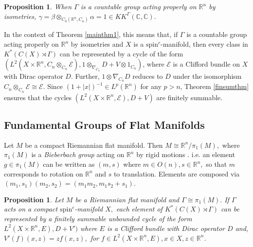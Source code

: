 \documentclass[a4paper,reqno]{amsart}
\numberwithin{equation}{section}
\def\C{\mathbb{C}}
\def\R{\mathbb{R}}
\newtheorem{prop}[thm]{Proposition}
\theoremstyle{definition}
\theoremstyle{remark}
\begin{document}
\begin{prop}{\cite{Val}}
 When $\Gamma$ is a countable group acting properly on $\R^n$ by isometries, $\gamma = \beta \otimes_{C_0(\R^n, C_n)} \alpha = 1 \in KK^\Gamma(\C,\C).$
\end{prop}

In the context of Theorem \ref{mainthm1}, this means that, if $\Gamma$ is a countable group acting properly on $\R^n$ by isometries and $X$ is a $\text{spin}^c$-manifold, then every class in $K^*(C(X) \rtimes \Gamma)$ can be represented by a cycle of the form $(L^2(X \times \R^n, C_n \otimes_{C_n} \mathcal{E}), 1 \otimes_{\nabla_{C_n}} D + V \otimes 1_{C_n})$, where $\mathcal{E}$ is a Clifford bundle on $X$ with Dirac operator $D$. Further, $1 \otimes \nabla_{C_n} D$ reduces to $D$ under the isomorphism $C_n \otimes_{C_n} \mathcal{E} \cong \mathcal{E}$. Since $(1+|x|)^{-1}\in L^p(\R^n)$ for any $p> n$, Theorem \ref{finsumthm} ensures that the cycles $(L^2(X \times \R^n, \mathcal{E}), D + V)$ are finitely summable. 



\subsection{Fundamental Groups of Flat Manifolds}
Let $M$ be a compact Riemannian flat manifold. Then $M \cong \R^n / \pi_1(M),$ where $\pi_1(M)$ is a \textit{Bieberbach group} acting on $\R^n$ by rigid motions \cite{Char}. i.e. an element $g \in \pi_1(M)$ can be written as $(m,s)$ where $m \in O(n), s \in \R^n,$ so that $m$ corresponds to rotation on $\R^n$ and $s$ to translation. Elements are composed via $(m_1,s_1)(m_2,s_2) = (m_1m_2, m_1s_2 + s_1)$.

\begin{prop}
\label{propbieber}
Let $M$ be a Riemannian flat manifold and $\Gamma \cong \pi_1(M).$ If $\Gamma$ acts on a compact $\text{spin}^c$-manifold $X,$ each element of $K^*(C(X) \rtimes \Gamma)$ can be represented by a finitely summable unbounded cycle of the form $L^2(X \times \R^n,E), D +V')$ where $E$ is a Clifford bundle with Dirac operator $D$ and, $V'(f)(x,z) = zf(x,z),$ for $f \in L^2(X \times \R^n, E), x\in X, z \in \R^n.$ 
\end{prop}
\end{document}
